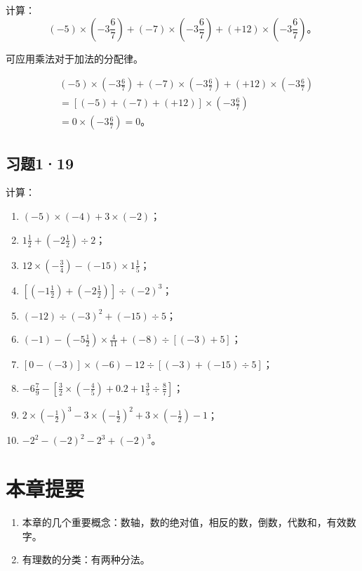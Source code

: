  计算：
\[
(-5) \times \left(-3\frac{6}{7}\right) + (-7) \times \left(-3\frac{6}{7}\right) + (+12) \times \left(-3\frac{6}{7}\right)。
\]

 可应用乘法对于加法的分配律。

\begin{align*}
&(-5) \times \left(-3\frac{6}{7}\right) + (-7) \times \left(-3\frac{6}{7}\right) + (+12) \times \left(-3\frac{6}{7}\right) \\
&= [(-5) + (-7) + (+12)] \times \left(-3\frac{6}{7}\right) \\
&= 0 \times \left(-3\frac{6}{7}\right) = 0。
\end{align*}

\subsection{习题1·19}

计算：

\begin{enumerate}
\item \((-5) \times (-4) + 3 \times (-2)\)；
\item \(1\frac{1}{2} + \left(-2\frac{1}{2}\right) \div 2\)；
\item \(12 \times \left(-\frac{3}{4}\right) - (-15) \times 1\frac{1}{5}\)；
\item \(\left[\left(-1\frac{1}{2}\right) + \left(-2\frac{1}{2}\right)\right] \div (-2)^3\)；
\item \((-12) \div (-3)^2 + (-15) \div 5\)；
\item \((-1) - \left(-5\frac{1}{2}\right) \times \frac{4}{11} + (-8) \div [(-3) + 5]\)；
\item \([0 - (-3)] \times (-6) - 12 \div [(-3) + (-15) \div 5]\)；
\item \(-6\frac{7}{9} - \left[\frac{3}{2} \times \left(-\frac{4}{5}\right) + 0.2 + 1\frac{3}{5} \div \frac{8}{7}\right]\)；
\item \(2 \times \left(-\frac{1}{2}\right)^3 - 3 \times \left(-\frac{1}{2}\right)^2 + 3 \times \left(-\frac{1}{2}\right) - 1\)；
\item \(-2^2 - (-2)^2 - 2^3 + (-2)^3\)。
\end{enumerate}

\section{本章提要}

\begin{enumerate}
\item
  本章的几个重要概念：数轴，数的绝对值，相反的数，倒数，代数和，有效数字。
\item
  有理数的分类：有两种分法。
\end{enumerate}

